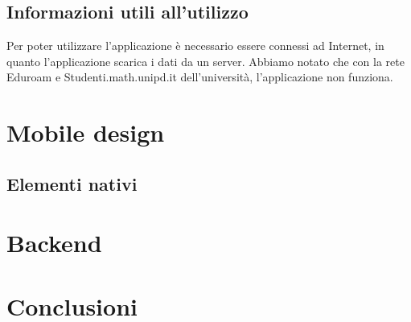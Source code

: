 \documentclass[12pt, a4paper, titlepage]{report}
\begin{document}
	\subsection{Informazioni utili all'utilizzo}
	Per poter utilizzare l'applicazione è necessario essere connessi ad Internet, in quanto l'applicazione scarica i dati da un server. Abbiamo notato che con la rete Eduroam e Studenti.math.unipd.it dell'università, l'applicazione non funziona.
	
	\section{Mobile design}
	
	\subsection{Elementi nativi}
	
	\section{Backend}
	
	\section{Conclusioni}
\end{document}
